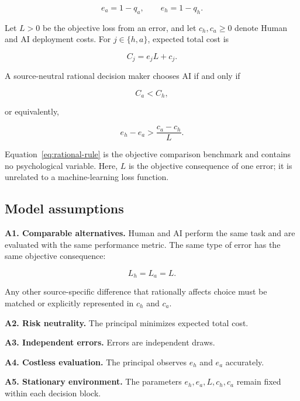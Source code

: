 \documentclass[11pt,a4paper]{article}
\newcommand{\condition}[1]{\textbf{#1}}
\begin{document}
\begin{equation*}
e_a=1-q_a,\qquad e_h=1-q_h.
\end{equation*}

Let $L>0$ be the objective loss from an error, and let $c_h,c_a\geq0$ denote Human and AI deployment costs. For $j\in\{h,a\}$, expected total cost is

\begin{equation*}
C_j=e_jL+c_j.
\end{equation*}

A source-neutral rational decision maker chooses AI if and only if

\begin{equation*}
C_a<C_h,
\end{equation*}

or equivalently,

\begin{equation}
e_h-e_a>\frac{c_a-c_h}{L}.
\label{eq:rational-rule}
\end{equation}

Equation~\ref{eq:rational-rule} is the objective comparison benchmark and contains no psychological variable. Here, $L$ is the objective consequence of one error; it is unrelated to a machine-learning loss function.

\subsection{Model assumptions}

\condition{A1. Comparable alternatives.} Human and AI perform the same task and are evaluated with the same performance metric. The same type of error has the same objective consequence:

\begin{equation*}
L_h=L_a=L.
\end{equation*}

Any other source-specific difference that rationally affects choice must be matched or explicitly represented in $c_h$ and $c_a$.

\condition{A2. Risk neutrality.} The principal minimizes expected total cost.

\condition{A3. Independent errors.} Errors are independent draws.

\condition{A4. Costless evaluation.} The principal observes $e_h$ and $e_a$ accurately.

\condition{A5. Stationary environment.} The parameters $e_h,e_a,L,c_h,c_a$ remain fixed within each decision block.
\end{document}

